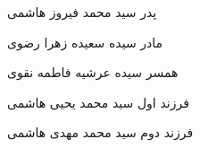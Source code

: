 


\begin{cvskills}

\cvskill
{پدر}
{سید محمد فیروز هاشمی}

\cvskill
{مادر}
{سیده سعیده زهرا رضوی}

\cvskill
{همسر}
{سیده عرشیه فاطمه نقوی}

\cvskill
{فرزند اول}
{سید محمد یحیی هاشمی}

\cvskill
{فرزند دوم}
{سید محمد مهدی هاشمی}

\end{cvskills}

